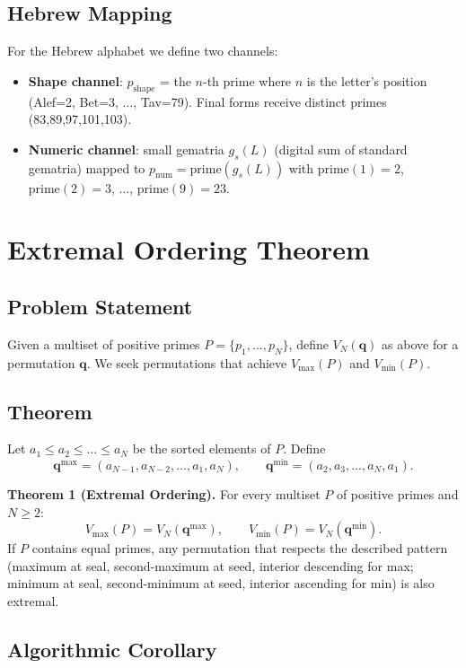 \documentclass[12pt]{article}
\theoremstyle{plain}
\theoremstyle{definition}
\theoremstyle{remark}
\begin{document}
\subsection{Hebrew Mapping}

For the Hebrew alphabet we define two channels:

\begin{itemize}
\item \textbf{Shape channel}: $p_{\text{shape}}$ = the $n$-th prime where $n$ is the letter's position (Alef=2, Bet=3, ..., Tav=79). Final forms receive distinct primes (83,89,97,101,103).
\item \textbf{Numeric channel}: small gematria $g_s(L)$ (digital sum of standard gematria) mapped to $p_{\text{num}} = \text{prime}(g_s(L))$ with $\text{prime}(1)=2$, $\text{prime}(2)=3$, ..., $\text{prime}(9)=23$.
\end{itemize}

\section{Extremal Ordering Theorem}

\subsection{Problem Statement}

Given a multiset of positive primes $P = \{p_1,\dots,p_N\}$, define $V_N(\mathbf{q})$ as above for a permutation $\mathbf{q}$. We seek permutations that achieve $V_{\max}(P)$ and $V_{\min}(P)$.

\subsection{Theorem}

Let $a_1 \le a_2 \le \dots \le a_N$ be the sorted elements of $P$. Define
\[
\mathbf{q}^{\max} = (a_{N-1}, a_{N-2}, \dots, a_1, a_N), \qquad
\mathbf{q}^{\min} = (a_2, a_3, \dots, a_N, a_1).
\]

\textbf{Theorem 1 (Extremal Ordering).} For every multiset $P$ of positive primes and $N \ge 2$:
\[
V_{\max}(P) = V_N(\mathbf{q}^{\max}), \qquad
V_{\min}(P) = V_N(\mathbf{q}^{\min}).
\]
If $P$ contains equal primes, any permutation that respects the described pattern (maximum at seal, second-maximum at seed, interior descending for max; minimum at seal, second-minimum at seed, interior ascending for min) is also extremal.

\subsection{Algorithmic Corollary}
\end{document}
